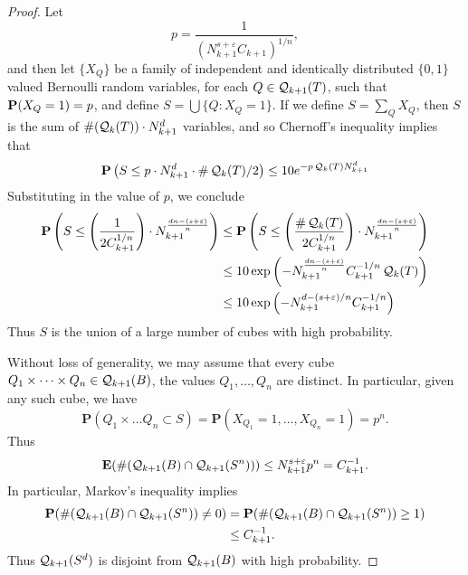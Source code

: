 \begin{proof}
    Let
    \[ p = \frac{1}{(N_{k+1}^{s + \varepsilon} C_{k+1})^{1/n}}, \]
    and then let $\{ X_Q \}$ be a family of independent and identically distributed $\{ 0, 1 \}$ valued Bernoulli random variables, for each $Q \in \operatorname{\mathcal{Q}}_{k+1}(T)$, such that $\operatorname{\mathbf{P}}(X_Q = 1) = p$, and define $S = \bigcup \{ Q : X_Q = 1 \}$. If we define $S = \sum_Q X_Q$, then $S$ is the sum of $\#(\operatorname{\mathcal{Q}}_k(T)) \cdot N_{k+1}^d$ variables, and so Chernoff's inequality implies that
    \[ \operatorname{\mathbf{P}} \left( S \leq p \cdot N_{k+1}^d \cdot \# \operatorname{\mathcal{Q}}_k(T)/2 \right) \leq 10 e^{- p \operatorname{\mathcal{Q}}_k(T) N_{k+1}^d} \]
    Substituting in the value of $p$, we conclude
    \begin{equation} \label{fourierdim1}
    \begin{split}
        \operatorname{\mathbf{P}} \left( S \leq \left( \frac{1}{2 C_{k+1}^{1/n}} \right) \cdot N_{k+1}^{\frac{dn - (s + \varepsilon)}{n}} \right) &\leq \operatorname{\mathbf{P}} \left( S \leq \left( \frac{\# \operatorname{\mathcal{Q}}_k(T)}{2 C_{k+1}^{1/n}} \right) \cdot N_{k+1}^{\frac{dn - (s + \varepsilon)}{n}} \right)\\
        &\leq 10 \exp \left( -N_{k+1}^{\frac{dn - (s + \varepsilon)}{n}} C_{k+1}^{-1/n} \operatorname{\mathcal{Q}}_k(T) \right)\\
        &\leq 10 \exp \left( -N_{k+1}^{d - (s + \varepsilon)/n} C_{k+1}^{-1/n} \right)
    \end{split}
    \end{equation}
    Thus $S$ is the union of a large number of cubes with high probability.

    Without loss of generality, we may assume that every cube $Q_1 \times \dots \times Q_n \in \operatorname{\mathcal{Q}}_{k+1}(B)$, the values $Q_1, \dots, Q_n$ are distinct. In particular, given any such cube, we have
    \[ \mathbf{P}(Q_1 \times \dots Q_n \subset S) = \mathbf{P}(X_{Q_1} = 1, \dots, X_{Q_n} = 1) = p^n. \]
    Thus
    \[ \mathbf{E}(\#(\operatorname{\mathcal{Q}}_{k+1}(B) \cap \operatorname{\mathcal{Q}}_{k+1}(S^n))) \leq N_{k+1}^{s+\varepsilon} p^n = C_{k+1}^{-1}. \]
    In particular, Markov's inequality implies
    \begin{equation} \label{fourierdim2}
    \begin{split}
        \mathbf{P}(\# (\operatorname{\mathcal{Q}}_{k+1}(B) \cap \operatorname{\mathcal{Q}}_{k+1}(S^n)) \neq 0) &= \mathbf{P}(\# (\operatorname{\mathcal{Q}}_{k+1}(B) \cap \operatorname{\mathcal{Q}}_{k+1}(S^n)) \geq 1)\\
        &\leq C_{k+1}^{-1}.
    \end{split}
    \end{equation}
    Thus $\operatorname{\mathcal{Q}}_{k+1}(S^d)$ is disjoint from $\operatorname{\mathcal{Q}}_{k+1}(B)$ with high probability.


\end{proof}
